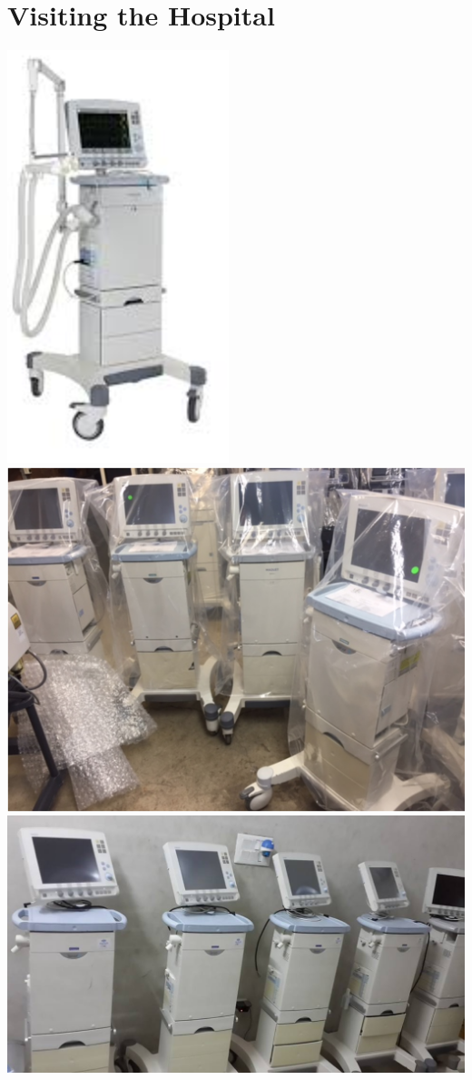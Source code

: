 \documentclass[12pt]{article}
\begin{document}
\begin{center}
 	\end{center}

 \section{Visiting the Hospital}
 	\begin{center}
		\includegraphics[scale=0.8]{h1.png}\\
		\includegraphics[scale=0.75]{h2.png}\\
		\includegraphics[scale=0.75]{h3.png}\\

\end{center}
\end{document}
